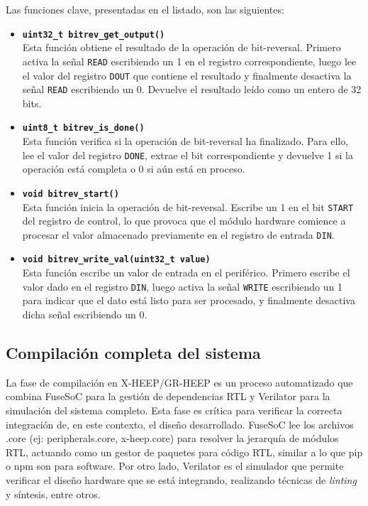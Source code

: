 Las funciones clave, presentadas en el listado, son las siguientes:

\begin{itemize}
    \item \textbf{\texttt{uint32\_t bitrev\_get\_output()}}\\
    Esta función obtiene el resultado de la operación de bit-reversal. Primero activa la señal \texttt{READ} escribiendo un 1 en el registro correspondiente, luego lee el valor del registro \texttt{DOUT} que contiene el resultado y finalmente desactiva la señal \texttt{READ} escribiendo un 0. Devuelve el resultado leído como un entero de 32 bits.
    \item \textbf{\texttt{uint8\_t bitrev\_is\_done()}}\\
    Esta función verifica si la operación de bit-reversal ha finalizado. Para ello, lee el valor del registro \texttt{DONE}, extrae el bit correspondiente y devuelve 1 si la operación está completa o 0 si aún está en proceso.
    \item \textbf{\texttt{void bitrev\_start()}}\\
    Esta función inicia la operación de bit-reversal. Escribe un 1 en el bit \texttt{START} del registro de control, lo que provoca que el módulo hardware comience a procesar el valor almacenado previamente en el registro de entrada \texttt{DIN}.
    \item \textbf{\texttt{void bitrev\_write\_val(uint32\_t value)}}\\
    Esta función escribe un valor de entrada en el periférico. Primero escribe el valor dado en el registro \texttt{DIN}, luego activa la señal \texttt{WRITE} escribiendo un 1 para indicar que el dato está listo para ser procesado, y finalmente desactiva dicha señal escribiendo un 0.
\end{itemize}

\subsection{Compilación completa del sistema}
La fase de compilación en X-HEEP/GR-HEEP es un proceso automatizado que combina FuseSoC para la gestión de dependencias RTL y Verilator para la simulación del sistema completo. Esta fase es crítica para verificar la correcta integración de, en este contexto, el diseño desarrollado. FuseSoC lee los archivos .core (ej: peripherals.core, x-heep.core) para resolver la jerarquía de módulos RTL, actuando como un gestor de paquetes para código RTL, similar a lo que pip o npm son para software. Por otro lado, Verilator es el simulador que permite verificar el diseño hardware que se está integrando, realizando técnicas de \textit{linting} y síntesis, entre otros. 

